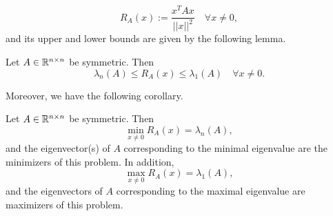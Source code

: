 \documentclass[10pt,a4paper]{article}
\begin{document}
\begin{equation*}
	R_A(x) := \frac{x^TAx}{||x||^2} \quad \forall x\neq 0,
\end{equation*}
and its upper and lower bounds are given by the following lemma.
\begin{lemma}
	Let $A\in \mathbb{R}^{n\times n}$ be symmetric. Then
	\begin{equation*}
		\lambda_n(A) \leq R_A(x) \leq \lambda_1(A) \quad \forall x\neq 0.
	\end{equation*}
\end{lemma}
Moreover, we have the following corollary.
\begin{corollary}
	Let $A\in \mathbb{R}^{n\times n}$ be symmetric. Then
	\begin{equation*}
		\min_{x\neq0} R_A(x) = \lambda_n(A),
	\end{equation*}
and the eigenvector(s) of $A$ corresponding to the minimal eigenvalue are the minimizers of this problem. In addition,
\begin{equation*}
	\max_{x\neq0} R_A(x) = \lambda_1(A),
\end{equation*}
and the eigenvectors of $A$ corresponding to the maximal eigenvalue are maximizers of this problem.
\end{corollary}
\end{document}
